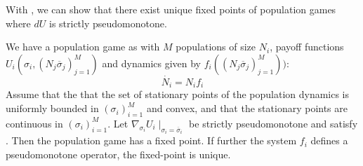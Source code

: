 With , we can show that there exist unique fixed points of population games where $dU$ is strictly pseudomonotone.
\begin{theorem}
  \label{thm:pop_game_exists_unique}
  We have a population game as  with $M$ populations of size $N_i$, payoff functions $U_i(\sigma_i, (N_j \overbar{\sigma}_j)_{j=1}^M)$ and dynamics given by $f_i((N_j \overbar{\sigma}_j)_{j=1}^M))$:
  \begin{equation}
    \dot{N_i} = N_i f_i
  \end{equation}
  Assume that the that the set of stationary points of the population dynamics is uniformly bounded in $(\sigma_i)_{i=1}^M$ and convex, and that the stationary points are continuous in $(\sigma_i)_{i=1}^M$. Let $\nabla_{\sigma_i} U_i \mid_{\sigma_i = \overbar{\sigma}_i}$ be strictly pseudomonotone and satisfy . Then the population game has a fixed point.
  If further the system $f_i$ defines a pseudomonotone operator, the fixed-point is unique.
\end{theorem}
